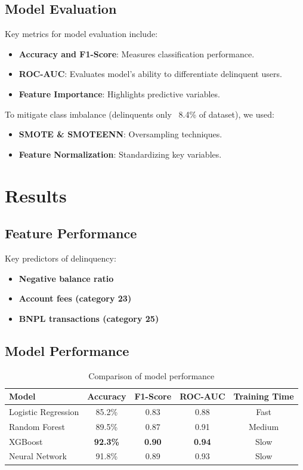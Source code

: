 \documentclass[12pt,letterpaper]{article}
\begin{document}
\subsection{Model Evaluation}
Key metrics for model evaluation include:
\begin{itemize}
    \item \textbf{Accuracy and F1-Score}: Measures classification performance.
    \item \textbf{ROC-AUC}: Evaluates model's ability to differentiate delinquent users.
    \item \textbf{Feature Importance}: Highlights predictive variables.
\end{itemize}
To mitigate class imbalance (delinquents only ~8.4\% of dataset), we used:
\begin{itemize}
    \item \textbf{SMOTE \& SMOTEENN}: Oversampling techniques.
    \item \textbf{Feature Normalization}: Standardizing key variables.
\end{itemize}

\section{Results}

\subsection{Feature Performance}
Key predictors of delinquency:
\begin{itemize}
    \item \textbf{Negative balance ratio}
    \item \textbf{Account fees (category 23)}
    \item \textbf{BNPL transactions (category 25)}
\end{itemize}

\subsection{Model Performance}
\begin{table}[H]
    \centering
    \begin{tabular}{|l|c|c|c|c|}
        \hline
        Model & Accuracy & F1-Score & ROC-AUC & Training Time \\
        \hline
        Logistic Regression & 85.2\% & 0.83 & 0.88 & Fast \\
        Random Forest & 89.5\% & 0.87 & 0.91 & Medium \\
        XGBoost & \textbf{92.3\%} & \textbf{0.90} & \textbf{0.94} & Slow \\
        Neural Network & 91.8\% & 0.89 & 0.93 & Slow \\
        \hline
    \end{tabular}
    \caption{Comparison of model performance}
\end{table}
\end{document}
